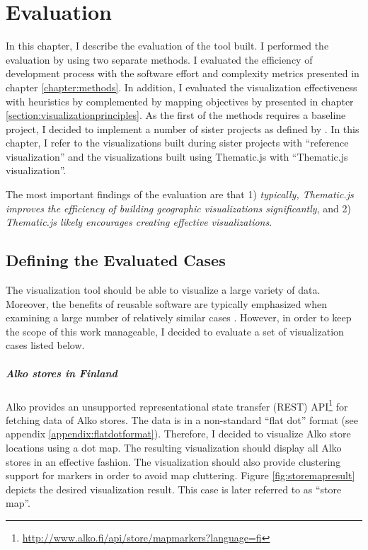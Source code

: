 
\chapter{Evaluation}
\label{chapter:evaluation}

In this chapter, I describe the evaluation of the tool built. I performed the evaluation by using two separate methods. I evaluated the efficiency of development process with the software effort and complexity metrics presented in chapter \ref{chapter:methods}. In addition, I evaluated the visualization effectiveness with heuristics by \citet{zuk_heuristics_2006} complemented by mapping objectives by \citet{schlichtmann_visualization_2002} presented in chapter \ref{section:visualizationprinciples}. As the first of the methods requires a baseline project, I decided to implement a number of sister projects as defined by \citet{kitchenham_evaluating_1998}. In this chapter, I refer to the visualizations built during sister projects with ``reference visualization'' and the visualizations built using Thematic.js with ``Thematic.js visualization''.

The most important findings of the evaluation are that 1) \emph{typically, Thematic.js improves the efficiency of building geographic visualizations significantly}, and 2) \emph{Thematic.js likely encourages creating effective visualizations}.

\section{Defining the Evaluated Cases}
\label{section:evaluatedcases}

The visualization tool should be able to visualize a large variety of data. Moreover, the benefits of reusable software are typically emphasized when examining a large number of relatively similar cases \citep{frakes_software_1996}. However, in order to keep the scope of this work manageable, I decided to evaluate a set of visualization cases listed below.

\paragraph{Alko stores in Finland}
Alko provides an unsupported representational state transfer (REST) API\footnote{\url{http://www.alko.fi/api/store/mapmarkers?language=fi}} for fetching data of Alko stores. The data is in a non-standard ``flat dot'' format (see appendix \ref{appendix:flatdotformat}). Therefore, I decided to visualize Alko store locations using a dot map. The resulting visualization should display all Alko stores in an effective fashion. The visualization should also provide clustering support for markers in order to avoid map cluttering. Figure \ref{fig:storemapresult} depicts the desired visualization result. This case is later referred to as ``store map''.

